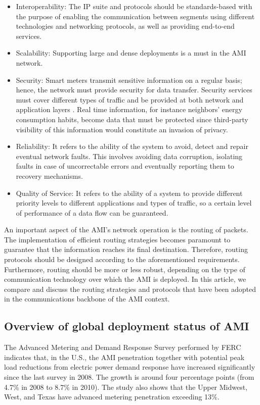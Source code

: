 \documentclass[11pt,draftclsnofoot,onecolumn]{IEEEtran}
\begin{document}
\begin{itemize}
\item Interoperability: The IP suite and protocols should be standards-based with the purpose of enabling the communication between segments using different technologies and networking protocols, as well as providing end-to-end services.
\item Scalability: Supporting large and dense deployments is a must in the AMI network. 
\item Security: Smart meters transmit sensitive information on a regular basis; hence, the network must provide security for data transfer. Security services must cover different types of traffic and be provided at both network and application layers \cite{Bennett2008}. Real time information, for instance neighbors' energy consumption habits, become data that must be protected since third-party visibility of this information would constitute an invasion of privacy.
\item Reliability: It refers to the ability of the system to avoid, detect and repair eventual network faults. This involves avoiding data corruption, isolating faults in case of uncorrectable errors and eventually reporting them to recovery mechanisms.
\item Quality of Service: It refers to the ability of a system to provide different priority levels to different applications and types of traffic, so a certain level of performance of a data flow can be guaranteed.
\end{itemize}

An important aspect of the AMI's network operation is the routing of packets. The implementation of efficient routing strategies becomes paramount to guarantee that the information reaches its final destination. Therefore, routing protocols should be designed according to the aforementioned requirements. Furthermore, routing should be more or less robust, depending on the type of communication technology over which the AMI is deployed. In this article, we compare and discuss the routing strategies and protocols that have been adopted in the communications backbone of the AMI context.

\subsection{Overview of global deployment status of AMI}\label{ami}

The Advanced Metering and Demand Response Survey performed by FERC \cite{FERC2012} indicates that, in the U.S., the AMI penetration together with potential peak load reductions from electric power demand response have increased significantly since the last survey in 2008. The growth is around four percentage points (from 4.7\% in 2008 to 8.7\% in 2010). The study also shows that the Upper Midwest, West, and Texas have advanced metering penetration exceeding 13\%.
\end{document}
